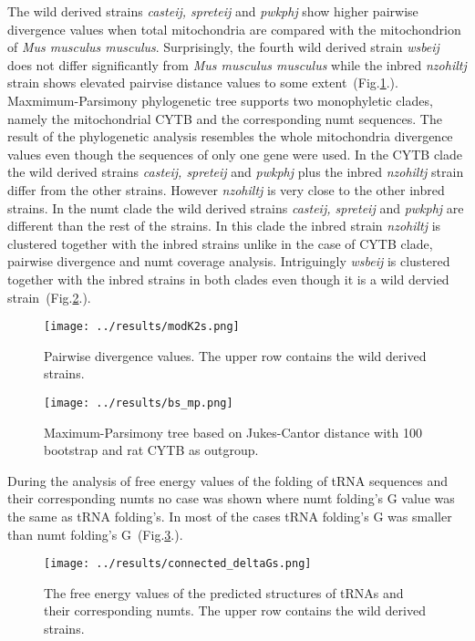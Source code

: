 \documentclass[a4paper,12pt]{article}
\numberwithin{equation}{section} %
\begin{document}
\indent The wild derived strains \textit{casteij, spreteij} and \textit{pwkphj} show higher pairwise divergence values when total mitochondria are compared with the mitochondrion of  \textit{Mus musculus musculus}. Surprisingly, the fourth wild derived strain \textit{wsbeij} does not differ significantly from \textit{Mus musculus musculus} while the inbred \textit{nzohiltj} strain shows elevated pairvise distance values to some extent~(Fig.\ref{fig:modK2s}.). \\ \indent Maxmimum-Parsimony phylogenetic tree supports two monophyletic clades, namely the mitochondrial CYTB and the corresponding numt sequences. The result of the phylogenetic analysis resembles the whole mitochondria divergence values even though the sequences of only one gene were used. In the CYTB clade the wild derived strains \textit{casteij, spreteij} and \textit{pwkphj} plus the inbred \textit{nzohiltj} strain differ from the other strains. However \textit{nzohiltj} is very close to the other inbred strains. In the numt clade the wild derived strains \textit{casteij, spreteij} and \textit{pwkphj} are different than the rest of the strains. In this clade the inbred strain \textit{nzohiltj} is clustered together with the inbred strains unlike in the case of CYTB clade, pairwise divergence and numt coverage analysis. Intriguingly \textit{wsbeij} is clustered together with the inbred strains in both clades even though it is a wild dervied strain~(Fig.\ref{fig:bs_mp}.).
\begin{figure}[H]
    \centering
    \captionsetup{justification=centering}
    \texttt{[image: ../results/modK2s.png]}
    \caption{Pairwise divergence values. The upper row contains the wild derived strains.}
    \label{fig:modK2s}
\end{figure}

\begin{figure}[H]
    \centering
    \captionsetup{justification=centering}
    \texttt{[image: ../results/bs\_mp.png]}
    \caption{Maximum-Parsimony tree based on Jukes-Cantor distance with 100 bootstrap and rat CYTB as outgroup.}
    \label{fig:bs_mp}
\end{figure}

\indent During the analysis of free energy values of the folding of tRNA sequences and their corresponding numts no case was shown where numt folding's \Delta G value was the same as tRNA folding's. In most of the cases tRNA folding's \Delta G was smaller than numt folding's \Delta G~(Fig.\ref{fig:deltaGs}.).
\begin{figure}[H]
    \centering
    \captionsetup{justification=centering}
    \texttt{[image: ../results/connected\_deltaGs.png]}
    \caption{The free energy values of the predicted structures  of tRNAs and their corresponding numts. The upper row contains the wild derived strains.}
    \label{fig:deltaGs}
\end{figure}
\end{document}
